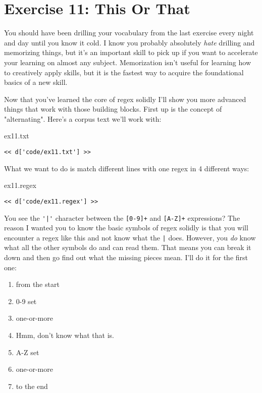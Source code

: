 \chapter{Exercise 11: This Or That}

You should have been drilling your vocabulary from the last exercise every night and day until you know it cold.  I know you probably absolutely \emph{hate} drilling
and memorizing things, but it's an important skill to pick up if you want to
accelerate your learning on almost any subject.  Memorization isn't useful for
learning how to creatively apply skills, but it is the fastest way to acquire
the foundational basics of a new skill.

Now that you've learned the core of regex solidly I'll show you more advanced things
that work with those building blocks.  First up is the concept of "alternating".
Here's a corpus text we'll work with:

\begin{code}{ex11.txt}
\begin{Verbatim}
<< d['code/ex11.txt'] >>
\end{Verbatim}
\end{code}

What we want to do is match different lines with one regex in 4 different ways:

\begin{code}{ex11.regex}
\begin{Verbatim}
<< d['code/ex11.regex'] >>
\end{Verbatim}
\end{code}

You see the \verb,'|', character between the \verb|[0-9]+| and \verb|[A-Z]+|
expressions? The reason I wanted you to know the basic symbols of regex solidly
is that you will encounter a regex like this and not know what the \verb,|, does.
However, you \emph{do} know what all the other symbols do and can read them.
That means you can break it down and then go find out what the missing pieces mean.
I'll do it for the first one:

\begin{enumerate}
\item from the start
\item 0-9 set
\item one-or-more
\item Hmm, don't know what that is.
\item A-Z set
\item one-or-more
\item to the end
\end{enumerate}

